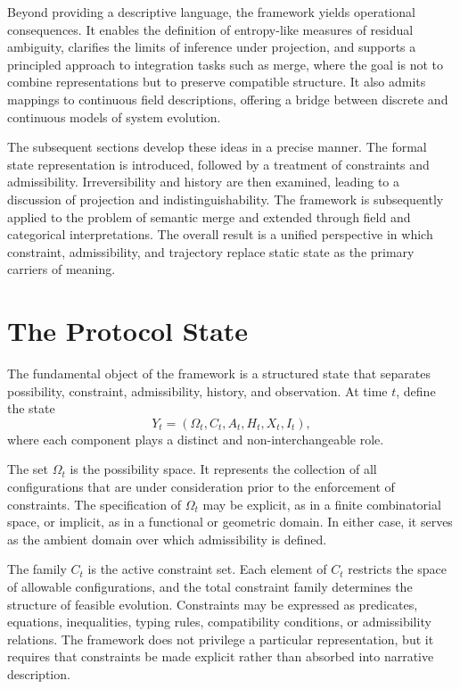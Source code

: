 \documentclass[11pt,oneside]{article}
\begin{document}
Beyond providing a descriptive language, the framework yields operational consequences. It enables the definition of entropy-like measures of residual ambiguity, clarifies the limits of inference under projection, and supports a principled approach to integration tasks such as merge, where the goal is not to combine representations but to preserve compatible structure. It also admits mappings to continuous field descriptions, offering a bridge between discrete and continuous models of system evolution.

The subsequent sections develop these ideas in a precise manner. The formal state representation is introduced, followed by a treatment of constraints and admissibility. Irreversibility and history are then examined, leading to a discussion of projection and indistinguishability. The framework is subsequently applied to the problem of semantic merge and extended through field and categorical interpretations. The overall result is a unified perspective in which constraint, admissibility, and trajectory replace static state as the primary carriers of meaning.

\section{The Protocol State}

The fundamental object of the framework is a structured state that separates possibility, constraint, admissibility, history, and observation. At time \( t \), define the state
\[
Y_t = (\Omega_t, C_t, A_t, H_t, X_t, I_t),
\]
where each component plays a distinct and non-interchangeable role.

The set \( \Omega_t \) is the possibility space. It represents the collection of all configurations that are under consideration prior to the enforcement of constraints. The specification of \( \Omega_t \) may be explicit, as in a finite combinatorial space, or implicit, as in a functional or geometric domain. In either case, it serves as the ambient domain over which admissibility is defined.

The family \( C_t \) is the active constraint set. Each element of \( C_t \) restricts the space of allowable configurations, and the total constraint family determines the structure of feasible evolution. Constraints may be expressed as predicates, equations, inequalities, typing rules, compatibility conditions, or admissibility relations. The framework does not privilege a particular representation, but it requires that constraints be made explicit rather than absorbed into narrative description.
\end{document}
